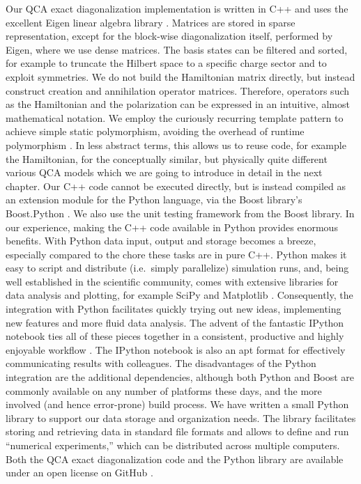 Our QCA exact diagonalization implementation is written in C++ and uses the
excellent Eigen linear algebra library \cite{eigen}. Matrices are stored in
sparse representation, except for the block-wise diagonalization itself,
performed by Eigen, where we use dense matrices. The basis states can be
filtered and sorted, for example to truncate the Hilbert space to a specific
charge sector and to exploit symmetries. We do not build the Hamiltonian matrix
directly, but instead construct creation and annihilation operator matrices.
Therefore, operators such as the Hamiltonian and the polarization can be
expressed in an intuitive, almost mathematical notation. We employ the curiously
recurring template pattern to achieve simple static polymorphism, avoiding the
overhead of runtime polymorphism \cite{andrei2001modern}. In less abstract
terms, this allows us to reuse code, for example the Hamiltonian, for the
conceptually similar, but physically quite different various QCA models which we
are going to introduce in detail in the next chapter. Our C++ code cannot be
executed directly, but is instead compiled as an extension module for the Python
language, via the Boost library's Boost.Python \cite{boost}. We also use the
unit testing framework from the Boost library. In our experience, making the C++
code available in Python provides enormous benefits. With Python data input,
output and storage becomes a breeze, especially compared to the chore these
tasks are in pure C++. Python makes it easy to script and distribute (i.e.\
simply parallelize) simulation runs, and, being well established in the
scientific community, comes with extensive libraries for data analysis and
plotting, for example SciPy and Matplotlib \cite{scipy}
\cite{hunter2007matplotlib}. Consequently, the integration with Python
facilitates quickly trying out new ideas, implementing new features and more
fluid data analysis. The advent of the fantastic IPython notebook ties all of
these pieces together in a consistent, productive and highly enjoyable workflow
\cite{perez2007ipython}. The IPython notebook is also an apt format for
effectively communicating results with colleagues. The disadvantages of the
Python integration are the additional dependencies, although both Python and
Boost are commonly available on any number of platforms these days, and the more
involved (and hence error-prone) build process. We have written a small Python
library to support our data storage and organization needs. The library
facilitates storing and retrieving data in standard file formats and allows to
define and run ``numerical experiments,'' which can be distributed across
multiple computers. Both the QCA exact diagonalization code and the Python
library are available under an open license on GitHub \cite{githubqca}
\cite{githubcoma}.




















